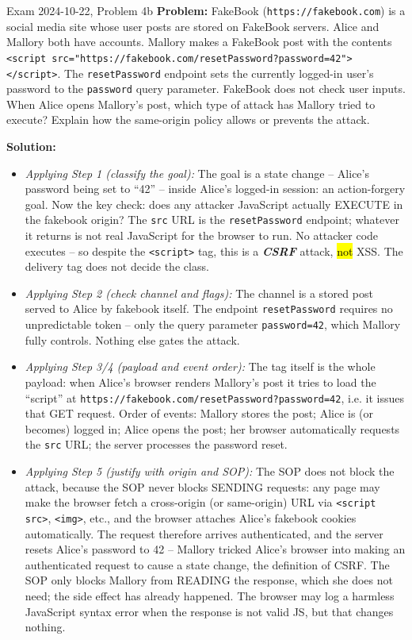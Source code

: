\documentclass[12pt, a4paper]{article}
\newcommand{\term}[1]{\textbf{\textit{#1}}}        %
\newcommand{\imp}[1]{\hl{#1}}                       %
\begin{document}
\begin{practicebox}{Exam 2024-10-22, Problem 4b}
\textbf{Problem:} FakeBook (\texttt{https://fakebook.com}) is a social media site whose user posts are stored on FakeBook servers. Alice and Mallory both have accounts. Mallory makes a FakeBook post with the contents \texttt{<script src="https://fakebook.com/resetPassword?password=42"></script>}. The \texttt{resetPassword} endpoint sets the currently logged-in user's password to the \texttt{password} query parameter. FakeBook does not check user inputs. When Alice opens Mallory's post, which type of attack has Mallory tried to execute? Explain how the same-origin policy allows or prevents the attack.

\textbf{Solution:}
\begin{itemize}
    \item \textit{Applying Step 1 (classify the goal):} The goal is a state change -- Alice's password being set to ``42'' -- inside Alice's logged-in session: an action-forgery goal. Now the key check: does any attacker JavaScript actually EXECUTE in the fakebook origin? The \texttt{src} URL is the \texttt{resetPassword} endpoint; whatever it returns is not real JavaScript for the browser to run. No attacker code executes -- so despite the \texttt{<script>} tag, this is a \term{CSRF} attack, \imp{not} XSS. The delivery tag does not decide the class.
    \item \textit{Applying Step 2 (check channel and flags):} The channel is a stored post served to Alice by fakebook itself. The endpoint \texttt{resetPassword} requires no unpredictable token -- only the query parameter \texttt{password=42}, which Mallory fully controls. Nothing else gates the attack.
    \item \textit{Applying Step 3/4 (payload and event order):} The tag itself is the whole payload: when Alice's browser renders Mallory's post it tries to load the ``script'' at \texttt{https://fakebook.com/resetPassword?password=42}, i.e. it issues that GET request. Order of events: Mallory stores the post; Alice is (or becomes) logged in; Alice opens the post; her browser automatically requests the \texttt{src} URL; the server processes the password reset.
    \item \textit{Applying Step 5 (justify with origin and SOP):} The SOP does not block the attack, because the SOP never blocks SENDING requests: any page may make the browser fetch a cross-origin (or same-origin) URL via \texttt{<script src>}, \texttt{<img>}, etc., and the browser attaches Alice's fakebook cookies automatically. The request therefore arrives authenticated, and the server resets Alice's password to 42 -- Mallory tricked Alice's browser into making an authenticated request to cause a state change, the definition of CSRF. The SOP only blocks Mallory from READING the response, which she does not need; the side effect has already happened. The browser may log a harmless JavaScript syntax error when the response is not valid JS, but that changes nothing.

\end{itemize}
\end{practicebox}
\end{document}
